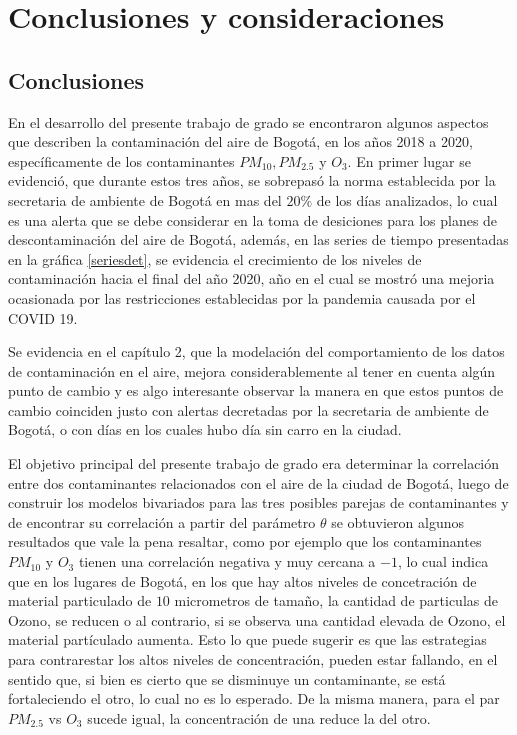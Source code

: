 \chapter{Conclusiones y consideraciones}

\section{Conclusiones}

En el desarrollo del presente trabajo de grado se encontraron algunos aspectos que describen la contaminación del aire de Bogotá, en los años 2018 a 2020, específicamente de los contaminantes $PM_{10}, PM_{2.5} $ y $O_3$. En primer lugar se evidenció, que durante estos tres años, se sobrepasó la norma establecida por la secretaria de ambiente de Bogotá en mas del $20\%$ de los días analizados, lo cual es una alerta que se debe considerar en la toma de desiciones para los planes de descontaminación del aire de Bogotá, además, en las series de tiempo presentadas en la gráfica \ref{seriesdet}, se evidencia el crecimiento de los niveles de contaminación hacia el final del año 2020, año en el cual se mostró una mejoria ocasionada por las restricciones establecidas por la pandemia causada por el COVID 19. 

Se evidencia en el capítulo 2, que la modelación del comportamiento de los datos de contaminación en el aire, mejora considerablemente al tener en cuenta algún punto de cambio y es algo interesante observar la manera en que estos puntos de cambio coinciden justo con alertas decretadas por la secretaria de ambiente de Bogotá, o con días en los cuales hubo día sin carro en la ciudad.

El objetivo principal del presente trabajo de grado era determinar la correlación entre dos contaminantes relacionados con el aire de la ciudad de Bogotá, luego de construir los modelos bivariados para las tres posibles parejas de contaminantes y de encontrar su correlación a partir del parámetro $\theta$ se obtuvieron algunos resultados que vale la pena resaltar, como por ejemplo que los contaminantes $PM_{10}$ y $O_3$ tienen una correlación negativa y muy cercana a $-1$, lo cual indica que en los lugares de Bogotá, en los que hay altos niveles de concetración de material particulado de $10$ micrometros de tamaño, la cantidad de particulas de Ozono, se reducen o al contrario, si se observa una cantidad elevada de Ozono, el material partículado aumenta. Esto lo que puede sugerir es que las estrategias para contrarestar los altos niveles de concentración, pueden estar fallando, en el sentido que, si bien es cierto que se disminuye un contaminante, se está fortaleciendo el otro, lo cual no es lo esperado. De la misma manera, para el par $PM_{2.5}$ vs $O_{3}$ sucede igual, la concentración de una reduce la del otro. 

